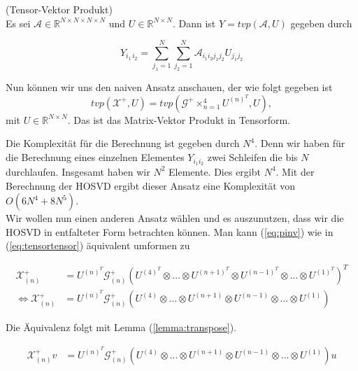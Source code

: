\begin{Definition} (Tensor-Vektor Produkt) \\
Es sei $\mathcal{A} \in \mathbb{R}^{N \times N \times N \times N}$ und $U \in \mathbb{R}^{N \times N}$.
Dann ist $Y=tvp(\mathcal{A},U)$ gegeben durch

\begin{equation*}
Y_{i_1 \, i_2} = \sum\limits_{j_1=1}^{N} \sum\limits_{j_2=1}^{N} \mathcal{A}_{i_1 i_2 j_1 j_2} U_{j_1 j_2}
\end{equation*}

\end{Definition}

Nun können wir uns den naiven Ansatz anschauen, der wie folgt gegeben ist
\begin{equation} \label{eq:pinv}
tvp(\mathscr{X}^{+},U) = tvp(\mathscr{G}^{+} \times_{n=1}^{4} U^{ (n) ^{T} },U) ,
\end{equation} 
mit $U \in \mathbb{R}^{N \times N}$. Das ist das Matrix-Vektor Produkt in Tensorform. 

Die Komplexität für die Berechnung ist gegeben durch $N^4$. Denn wir haben für die Berechnung eines einzelnen Elementes $Y_{i_1 i_2}$ zwei Schleifen die bis $N$ durchlaufen. Insgesamt haben wir $N^2$ Elemente. Dies ergibt $N^4$. 
Mit der Berechnung der HOSVD ergibt dieser Ansatz eine Komplexität von $O(6N^4 + 8N^5)$. \\

Wir wollen nun einen anderen Ansatz wählen und es auszunutzen, dass wir die HOSVD in entfalteter Form betrachten können.
Man kann (\ref{eq:pinv}) wie in (\ref{eq:tensortensor}) äquivalent umformen zu

\begin{equation}
\begin{aligned}
\mathscr{X}^{+}_{(n)}  &= U^{ (n) ^{T} }  \mathscr{G}^{+}_{(n)} ( U^{ (4) ^{T} } \otimes \dots \otimes U^{ (n+1) ^{T} } \otimes U^{ (n-1) ^{T} } \otimes \dots \otimes U^{ (1) ^{T} })^{T} \\ \iff
\mathscr{X}^{+}_{(n)} &= U^{ (n) ^{T} }  \mathscr{G}^{+}_{(n)} ( U^{ (4)  } \otimes \dots \otimes U^{ (n+1) } \otimes U^{ (n-1) } \otimes \dots \otimes U^{ (1) })
\end{aligned}
\end{equation}

Die Äquivalenz folgt mit Lemma (\ref{lemma:transpose}).

\begin{equation} \label{eq:pinvv}
\begin{aligned}
\mathscr{X}^{+}_{(n)}v&= U^{ (n) ^{T} }  \mathscr{G}^{+}_{(n)} ( U^{ (4)  } \otimes \dots \otimes U^{ (n+1) } \otimes U^{ (n-1) } \otimes \dots \otimes U^{ (1) }) u
\end{aligned}
\end{equation}

